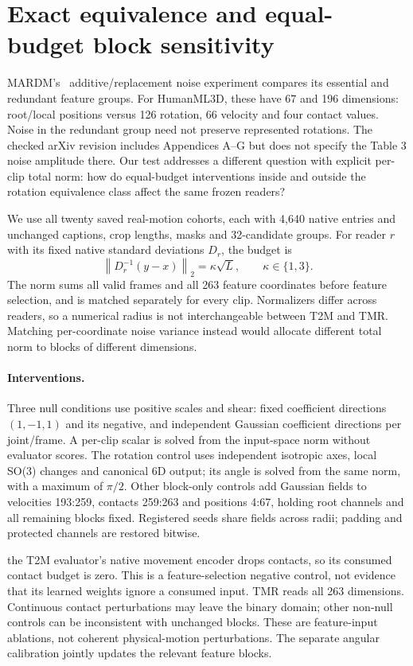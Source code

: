 \section{Exact equivalence and equal-budget block sensitivity}
MARDM's~\cite{mardm2025} additive/replacement noise experiment compares its essential and redundant feature groups. For HumanML3D, these have 67 and 196 dimensions: root/local positions versus 126 rotation, 66 velocity and four contact values. Noise in the redundant group need not preserve represented rotations. The checked arXiv revision includes Appendices A--G but does not specify the Table 3 noise amplitude there. Our test addresses a different question with explicit per-clip total norm: how do equal-budget interventions inside and outside the rotation equivalence class affect the same frozen readers?

We use all twenty saved real-motion cohorts, each with 4,640 native entries and unchanged captions, crop lengths, masks and 32-candidate groups. For reader $r$ with its fixed native standard deviations $D_r$, the budget is
\begin{equation}
\left\|D_r^{-1}(y-x)\right\|_2=\kappa\sqrt L,\qquad\kappa\in\{1,3\}.
\end{equation}
The norm sums all valid frames and all 263 feature coordinates before feature selection, and is matched separately for every clip. Normalizers differ across readers, so a numerical radius is not interchangeable between T2M and TMR. Matching per-coordinate noise variance instead would allocate different total norm to blocks of different dimensions.

\paragraph{Interventions.}
Three null conditions use positive scales and shear: fixed coefficient directions $(1,-1,1)$ and its negative, and independent Gaussian coefficient directions per joint/frame. A per-clip scalar is solved from the input-space norm without evaluator scores. The rotation control uses independent isotropic axes, local SO(3) changes and canonical 6D output; its angle is solved from the same norm, with a maximum of $\pi/2$. Other block-only controls add Gaussian fields to velocities 193:259, contacts 259:263 and positions 4:67, holding root channels and all remaining blocks fixed. Registered seeds share fields across radii; padding and protected channels are restored bitwise.

the T2M evaluator's native movement encoder drops contacts, so its consumed contact budget is zero. This is a feature-selection negative control, not evidence that its learned weights ignore a consumed input. TMR reads all 263 dimensions. Continuous contact perturbations may leave the binary domain; other non-null controls can be inconsistent with unchanged blocks. These are feature-input ablations, not coherent physical-motion perturbations. The separate angular calibration jointly updates the relevant feature blocks.

